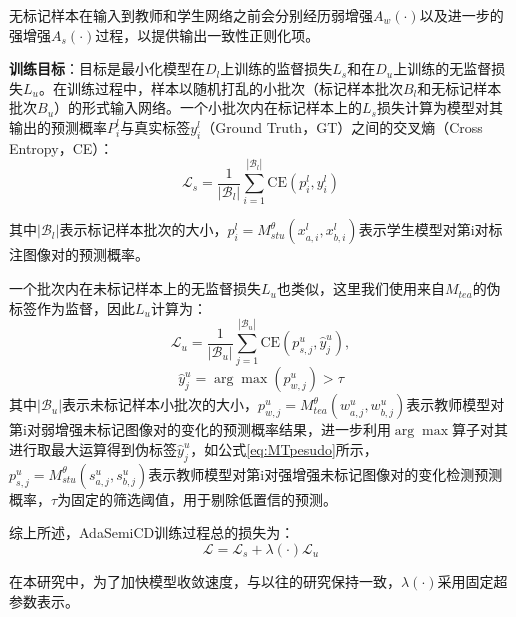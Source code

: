 \documentclass[lang=chs, degree=master, blindreview=false, adobe=false]{yanputhesis}
\begin{document}
无标记样本在输入到教师和学生网络之前会分别经历弱增强$A_{w}(\cdot)$以及进一步的强增强$A_{s}(\cdot)$过程，以提供输出一致性正则化项。

\textbf{训练目标}：目标是最小化模型在$D_{l}$上训练的监督损失$L_s$和在$D_{u}$上训练的无监督损失$L_u$。在训练过程中，样本以随机打乱的小批次（标记样本批次$B_l$和无标记样本批次$B_u$）的形式输入网络。一个小批次内在标记样本上的$L_s$损失计算为模型对其输出的预测概率$P_{i}^{l}$与真实标签$y_{i}^{l}$（Ground Truth，GT）之间的交叉熵（Cross Entropy，CE）：
\begin{equation}
  \label{eq:MTLossS}
  \mathcal{L}_{s}=\frac{1}{\left|\mathcal{B}_{l}\right|} \sum_{i=1}^{\left|\mathcal{B}_{l}\right|} \mathrm{CE}\left(p_{i}^{l}, y_{i}^{l}\right)
\end{equation}

其中$\left|\mathcal{B}_{l}\right|$表示标记样本批次的大小，$p_{i}^{l}=M_{stu}^{\theta}\left(x_{a,i}^{l}, x_{b,i}^{l}\right)$表示学生模型对第i对标注图像对的预测概率。

一个批次内在未标记样本上的无监督损失$L_u$也类似，这里我们使用来自$M_{tea}$的伪标签作为监督，因此$L_u$计算为：
\begin{equation}
  \label{eq:MTLossU}
  \mathcal{L}_{u}=\frac{1}{\left|\mathcal{B}_{u}\right|} \sum_{j=1}^{\left|\mathcal{B}_{u}\right|} \mathrm{CE}\left(p_{s, j}^{u}, \hat{y}^{u}_{j}\right),
\end{equation}
\begin{equation}
  \label{eq:MTpesudo}
  \hat{y}^{u}_{j}={\arg \max } \left(p_{w, j}^{u}\right)>\tau
\end{equation}
其中$\left|\mathcal{B}_{u}\right|$表示未标记样本小批次的大小，$p_{w, j}^{u}=M_{t e a}^{\theta}\left(w_{a, j}^{u}, w_{b, j}^{u}\right)$表示教师模型对第i对弱增强未标记图像对的变化的预测概率结果，进一步利用$\arg \max$算子对其进行取最大运算得到伪标签$\hat{y}^{u}_{j}$，如公式\ref{eq:MTpesudo}所示，$p_{s, j}^{u}=M_{s t u}^{\theta}\left(s_{a, j}^{u}, s_{b, j}^{u}\right)$表示教师模型对第i对强增强未标记图像对的变化检测预测概率，$\tau$为固定的筛选阈值，用于剔除低置信的预测。

综上所述，AdaSemiCD训练过程总的损失为：
\begin{equation}
  \label{eq:EMALoss}
  \mathcal{L}=\mathcal{L}_{s}+\lambda(\cdot) \mathcal{L}_{u}
\end{equation}

在本研究中，为了加快模型收敛速度，与以往的研究\cite{sohn2020fixmatch}\cite{transformation_medical}保持一致，$\lambda(\cdot)$采用固定超参数表示。
\end{document}
